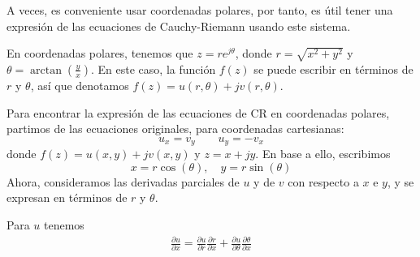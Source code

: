 A veces, es conveniente usar coordenadas polares, por tanto, es útil tener una expresión de las ecuaciones de Cauchy-Riemann usando este sistema.

En coordenadas polares, tenemos que $z=re^{j\theta}$, donde $r=\sqrt{x^2+y^2}$ y $\theta=\arctan(\frac{y}{x})$. En este caso, la función $f(z)$ se puede escribir en términos de $r$ y $\theta$, así que denotamos $f(z)=u(r,\theta)+jv(r,\theta)$.

Para encontrar la expresión de las ecuaciones de CR en coordenadas polares, partimos de las ecuaciones originales, para coordenadas cartesianas:
\[
  u_x = v_y \qquad u_y = -v_x
\]
donde $f(z)=u(x,y)+jv(x,y)$ y $z=x+jy$. En base a ello, escribimos
\[
  x=r\cos(\theta),\quad y=r\sin(\theta)
\]
Ahora, consideramos las derivadas parciales de $u$ y de $v$ con respecto a $x$ e $y$, y se expresan en términos de $r$ y $\theta$.

Para $u$ tenemos
\begin{align*}
  \frac{\partial u}{\partial x} = \frac{\partial u}{\partial r}\frac{\partial r}{\partial x} + \frac{\partial u}{\partial \theta}\frac{\partial \theta}{\partial x}
\end{align*}
